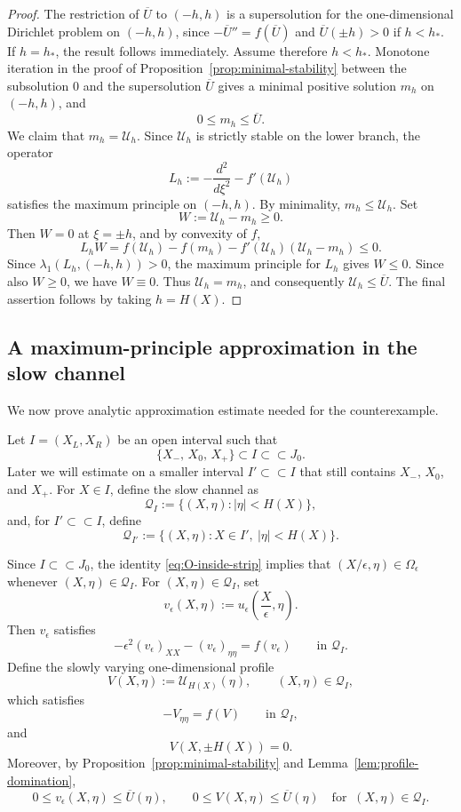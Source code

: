 \documentclass[reqno,12pt]{amsart}
\numberwithin{equation}{section}
\theoremstyle{remark}
\begin{document}
\begin{proof}
The restriction of $\overline U$ to $(-h,h)$ is a supersolution for the
one-dimensional Dirichlet problem on $(-h,h)$, since
$-\overline U''=f(\overline U)$
and $\overline U(\pm h)>0$ if $h<h_*$. If $h=h_*$, the result follows immediately. Assume therefore $h<h_*$. Monotone iteration in the proof of  Proposition~\ref{prop:minimal-stability} between the subsolution $0$ and the supersolution $\overline U$ gives a minimal positive
solution $m_h$ on $(-h,h)$, and
$$
0\le m_h\le \overline U.
$$
We claim that $m_h=\mathcal U_h$. Since $\mathcal U_h$ is strictly stable on the lower
branch, the operator
$$
L_h:=-\frac{d^2}{d\xi^2}-f'(\mathcal U_h)
$$
satisfies the maximum principle on $(-h,h)$. By minimality, $m_h\le \mathcal U_h$. Set
$$
W:=\mathcal U_h-m_h\ge0.
$$
Then $W=0$ at $\xi=\pm h$, and by convexity of $f$,
$$
L_h W
=f(\mathcal U_h)-f(m_h)-f'(\mathcal U_h)(\mathcal U_h-m_h)\le0.
$$
Since $\lambda_1(L_h, (-h,h))>0$, the maximum principle for $L_h$ gives $W\le 0$. Since also $W\ge0$, we have
$W\equiv0$. Thus $\mathcal U_h=m_h$, and consequently $\mathcal U_h\le\overline U$.
The final assertion follows by taking $h=H(X)$.
\end{proof}


\subsection{A maximum-principle approximation in the slow channel}\label{sec:c0-approx}

We now prove analytic approximation estimate needed for the counterexample.  

Let $I=(X_L,X_R)$ be an open interval such that
$$
\{X_-,\,X_0,\,X_+\}\subset I\subset\subset J_0.
$$
Later we will estimate on a smaller interval $I'\subset\subset I$ that still contains
$X_-$, $X_0$, and $X_+$.  For $X\in I$, define the slow channel as
$$
\mathcal Q_I:=\{(X,\eta): |\eta|<H(X)\},
$$
and, for $I'\subset\subset I$, define
$$
\mathcal Q_{I'}:=\{(X,\eta): X\in I',\ |\eta|<H(X)\}.
$$

Since $I\subset\subset J_0$, the identity \eqref{eq:O-inside-strip} implies that $(X/\epsilon, \eta)\in \Omega_\epsilon$ whenever $(X,\eta)\in \mathcal Q_I$.
For $(X,\eta)\in\mathcal Q_I$, set
\begin{equation}\label{eq:defn-v}
    v_\epsilon(X,\eta):=u_\epsilon\left(\frac{X}{\epsilon},\eta\right).
\end{equation}
Then $v_\epsilon$ satisfies
$$
-\epsilon^2(v_\epsilon)_{XX}-(v_\epsilon)_{\eta\eta}=f(v_\epsilon) \qquad\text{in }\mathcal Q_I.
$$
Define the slowly varying one-dimensional profile
$$
V(X,\eta):=\mathcal U_{H(X)}(\eta), \qquad (X,\eta)\in\mathcal Q_I,
$$
which satisfies
$$
-V_{\eta\eta}=f(V) \qquad\text{in }\mathcal Q_I,
$$
and
$$
V(X,\pm H(X))=0.
$$
Moreover, by Proposition~\ref{prop:minimal-stability} and
Lemma~\ref{lem:profile-domination},
$$
0\le v_\epsilon(X,\eta)\le \overline U(\eta),
\qquad
0\le V(X,\eta)\le \overline U(\eta)
\quad\text{for }\ (X,\eta)\in\mathcal Q_I.
$$
\end{document}
